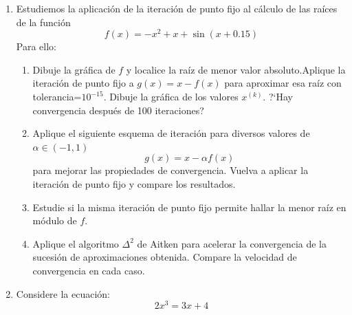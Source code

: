 \documentclass[12pt,letterpaper]{article}
\begin{document}
\begin{enumerate}
\item Estudiemos la aplicaci\'on de la iteraci\'on de punto fijo al c\'alculo de las ra\'ices de la funci\'on
$$
f(x) = -x^2 + x + \sin(x + 0.15)
$$
Para ello:
 \begin{enumerate}
  \item Dibuje la gr\'afica de $f$ y localice la ra\'iz de menor valor absoluto.Aplique la iteraci\'on de punto fijo a $g(x) = x - f(x)$ para aproximar esa ra\'iz con tolerancia=$10^{-15}$. Dibuje la
 gr\'afica de los valores $x^{(k)}$. ?`Hay convergencia despu\'es de 100 iteraciones?

 \item Aplique el siguiente esquema de iteraci\'on para diversos valores de $\alpha \in (-1,1)$ 
 $$
 g(x) = x - \alpha f(x)
 $$
 para mejorar las propiedades de convergencia. Vuelva a aplicar la iteraci\'on de punto fijo y compare los resultados.

 \item Estudie si la misma iteraci\'on de punto fijo permite hallar la menor ra\'iz en m\'odulo de $f$.

 \item Aplique el algoritmo $\Delta^2$ de Aitken para acelerar la convergencia de la sucesi\'on de aproximaciones obtenida.
Compare la velocidad de convergencia en cada caso.
 \end{enumerate}
\item Considere la ecuaci\'on:
\begin{equation}\label{eq1}
 2x^3 = 3x+4
\end{equation}


\end{enumerate}
\end{document}
